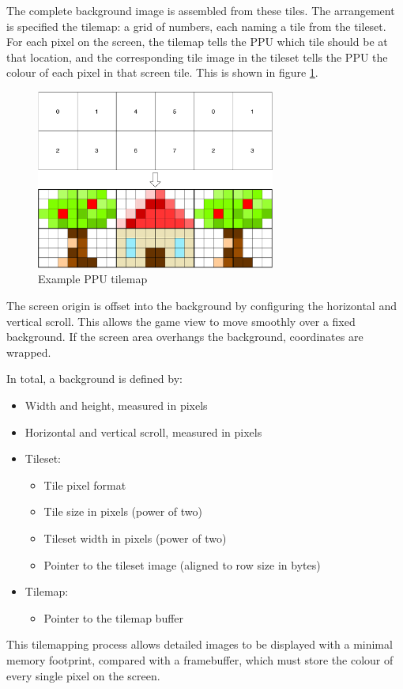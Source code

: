The complete background image is assembled from these tiles. The arrangement is specified the tilemap: a grid of numbers, each naming a tile from the tileset. For each pixel on the screen, the tilemap tells the PPU which tile should be at that location, and the corresponding tile image in the tileset tells the PPU the colour of each pixel in that screen tile. This is shown in figure \ref{diagram:ppu_tilemap}.

\begin{figure}[H]
\centering
\caption{Example PPU tilemap}
\label{diagram:ppu_tilemap}
\includegraphics[width=0.7\textwidth]{diagrams/ppu_tilemap.pdf}
\end{figure}

The screen origin is offset into the background by configuring the horizontal and vertical scroll. This allows the game view to move smoothly over a fixed background. If the screen area overhangs the background, coordinates are wrapped.

In total, a background is defined by:

\begin{itemize}
	\item Width and height, measured in pixels
	\item Horizontal and vertical scroll, measured in pixels
	\item Tileset:
	\begin{itemize}
		\item Tile pixel format
		\item Tile size in pixels (power of two)
		\item Tileset width in pixels (power of two)
		\item Pointer to the tileset image (aligned to row size in bytes)
	\end{itemize}
	\item Tilemap:
	\begin{itemize}
		\item Pointer to the tilemap buffer
	\end{itemize}
\end{itemize}

This tilemapping process allows detailed images to be displayed with a minimal memory footprint, compared with a framebuffer, which must store the colour of every single pixel on the screen.